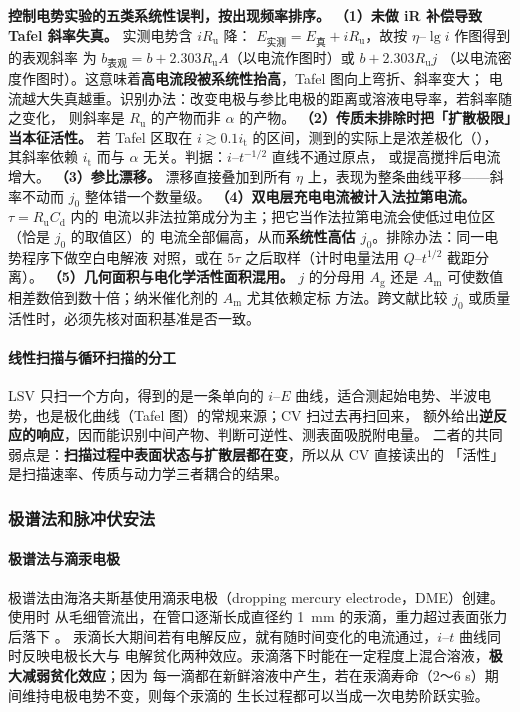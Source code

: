 \begin{pitfall}
\textbf{控制电势实验的五类系统性误判，按出现频率排序。}
\textbf{（1）未做 iR 补偿导致 Tafel 斜率失真。} 实测电势含 $iR_{\mathrm{u}}$ 降：
$E_{\text{实测}}=E_{\text{真}}+iR_{\mathrm{u}}$，故按 $\eta$--$\lg i$ 作图得到的表观斜率
为 $b_{\text{表观}}=b+2.303R_{\mathrm{u}}A$（以电流作图时）或 $b+2.303R_{\mathrm{u}}j$
（以电流密度作图时）。这意味着\textbf{高电流段被系统性抬高}，Tafel 图向上弯折、斜率变大；
电流越大失真越重。识别办法：改变电极与参比电极的距离或溶液电导率，若斜率随之变化，
则斜率是 $R_{\mathrm{u}}$ 的产物而非 $\alpha$ 的产物。
\textbf{（2）传质未排除时把「扩散极限」当本征活性。} 若 Tafel 区取在
$i\gtrsim0.1i_{\mathrm{t}}$ 的区间，测到的实际上是浓差极化（），
其斜率依赖 $i_{\mathrm{t}}$ 而与 $\alpha$ 无关。判据：$i$--$t^{-1/2}$ 直线不通过原点，
或提高搅拌后电流增大。
\textbf{（3）参比漂移。} 漂移直接叠加到所有 $\eta$ 上，表现为整条曲线平移——斜率不动而
$j_0$ 整体错一个数量级。
\textbf{（4）双电层充电电流被计入法拉第电流。} $\tau=R_{\mathrm{u}}C_{\mathrm{d}}$ 内的
电流以非法拉第成分为主；把它当作法拉第电流会使低过电位区（恰是 $j_0$ 的取值区）的
电流全部偏高，从而\textbf{系统性高估 $j_0$}。排除办法：同一电势程序下做空白电解液
对照，或在 $5\tau$ 之后取样（计时电量法用 $Q$--$t^{1/2}$ 截距分离）。
\textbf{（5）几何面积与电化学活性面积混用。} $j$ 的分母用 $A_{\mathrm{g}}$ 还是
$A_{\mathrm{m}}$ 可使数值相差数倍到数十倍；纳米催化剂的 $A_{\mathrm{m}}$ 尤其依赖定标
方法。跨文献比较 $j_0$ 或质量活性时，必须先核对面积基准是否一致。
\end{pitfall}

\paragraph{线性扫描与循环扫描的分工} LSV 只扫一个方向，得到的是一条单向的 $i$--$E$
曲线，适合测起始电势、半波电势，也是极化曲线（Tafel 图）的常规来源；CV 扫过去再扫回来，
额外给出\textbf{逆反应的响应}，因而能识别中间产物、判断可逆性、测表面吸脱附电量。
二者的共同弱点是：\textbf{扫描过程中表面状态与扩散层都在变}，所以从 CV 直接读出的
「活性」是扫描速率、传质与动力学三者耦合的结果。

\subsubsection{极谱法和脉冲伏安法}

\paragraph{极谱法与滴汞电极} 极谱法由海洛夫斯基使用滴汞电极（dropping mercury
electrode，DME）创建。使用时  从毛细管流出，在管口逐渐长成直径约 \qty{1}{mm}
的汞滴，重力超过表面张力后落下 。
汞滴长大期间若有电解反应，就有随时间变化的电流通过，$i$--$t$ 曲线同时反映电极长大与
电解贫化两种效应。汞滴落下时能在一定程度上混合溶液，\textbf{极大减弱贫化效应}；因为
每一滴都在新鲜溶液中产生，若在汞滴寿命（2～6 s）期间维持电极电势不变，则每个汞滴的
生长过程都可以当成一次电势阶跃实验。


